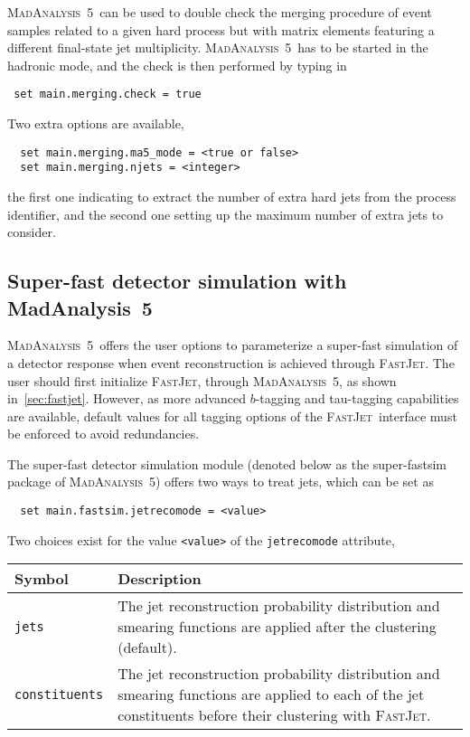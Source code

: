 \documentclass[a4paper]{article}
\newcommand{\MA}{\textsc{MadAnalysis}~5}
\newcommand{\MAnorm}{{MadAnalysis}~5}
\newcommand{\FJ}{\textsc{FastJet}}
\begin{document}
\noindent \MA\ can be used to double check the merging procedure of event samples related
to a given hard process but with matrix elements featuring a different
final-state jet multiplicity. \MA\ has to be started in the hadronic mode, and
the check is then performed by typing in
{\color{ao}\begin{verbatim}
 set main.merging.check = true
\end{verbatim}}
\noindent Two extra options are available,
{\color{ao}\begin{verbatim}
  set main.merging.ma5_mode = <true or false>
  set main.merging.njets = <integer>
\end{verbatim}}
\noindent the first one indicating to extract the number of extra hard jets from the
process identifier, and the second one setting up the maximum number of extra
jets to consider.


\begin{shaded}
	\section{\Large Super-fast detector simulation with \MAnorm}
\end{shaded}
\MA\ offers the user options to parameterize a super-fast simulation of a
detector response when event reconstruction is achieved through \FJ. The user
should first initialize \FJ, through \MA, as shown in~\autoref{sec:fastjet}.
However, as more advanced $b$-tagging and tau-tagging capabilities are
available, default values for all tagging options of the \FJ\ interface must be
enforced to avoid redundancies.

The super-fast detector simulation module (denoted below as the super-fastsim
package of \MA) offers two ways to treat jets, which can be set as
{\color{ao} \begin{verbatim}
  set main.fastsim.jetrecomode = <value>
\end{verbatim}}
\noindent Two choices exist for the value \verb+<value>+ of the
{\tt jetrecomode} attribute,
\renewcommand{\arraystretch}{1.2}%
\begin{center}
  \begin{tabular}{l p{8.4cm}}
    \hline
    Symbol& Description\\
    \hline
    \color{ao} \verb?jets? &
      The jet reconstruction probability distribution and smearing functions are
      applied after the clustering (default).\\
    \color{ao} \verb?constituents?   &
      The jet reconstruction probability distribution and smearing functions are
      applied to each of the jet constituents before their clustering with \FJ.\\
    \hline
  \end{tabular}
\end{center}
\end{document}
